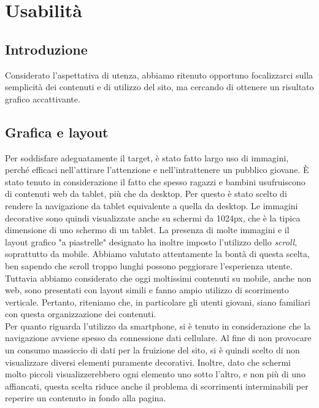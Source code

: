 \documentclass[12pt]{article}
\begin{document}
	
	\section{Usabilità}
	
	\subsection{Introduzione}
	
	Considerato l'aspettativa di utenza, abbiamo ritenuto opportuno focalizzarci sulla semplicità dei contenuti e di utilizzo del sito, ma cercando di ottenere un risultato grafico accattivante.
	
	\subsection{Grafica e layout}
	
	Per soddisfare adeguatamente il target, è stato fatto largo uso di immagini, perché efficaci nell'attirare l'attenzione e nell'intrattenere un pubblico giovane. È stato tenuto in considerazione il fatto che spesso ragazzi e bambini usufruiscono di contenuti web da tablet, più che da desktop. Per questo è stato scelto di rendere la navigazione da tablet equivalente a quella da desktop. Le immagini decorative sono quindi visualizzate anche su schermi da 1024px, che è la tipica dimensione di uno schermo di un tablet.
	La presenza di molte immagini e il layout grafico "a piastrelle" designato ha inoltre imposto l'utilizzo dello \textit{scroll}, soprattutto da mobile. Abbiamo valutato attentamente la bontà di questa scelta, ben sapendo che scroll troppo lunghi possono peggiorare l'esperienza utente. Tuttavia abbiamo considerato che oggi moltissimi contenuti su mobile, anche non web, sono presentati con layout simili e fanno ampio utilizzo di scorrimento verticale. Pertanto, riteniamo che, in particolare gli utenti giovani, siano familiari con questa organizzazione dei contenuti. \\
	Per quanto riguarda l'utilizzo da smartphone, si è tenuto in considerazione che la navigazione avviene spesso da connessione dati cellulare. Al fine di non provocare un consumo massiccio di dati per la fruizione del sito, si è quindi scelto di non visualizzare diversi elementi puramente decorativi. Inoltre, dato che schermi molto piccoli visualizzerebbero ogni elemento uno sotto l'altro, e non più di uno affiancati, questa scelta riduce anche il problema di scorrimenti interminabili per reperire un contenuto in fondo alla pagina.\\
	
\end{document}
